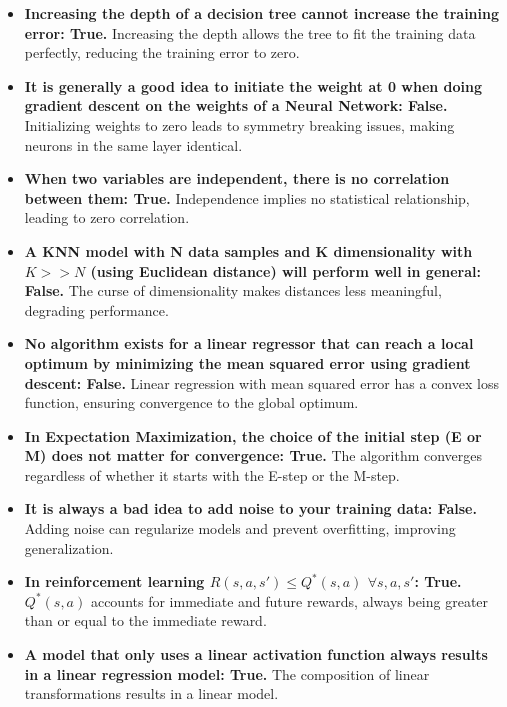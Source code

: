 \documentclass[10pt,a4paper]{article}
\begin{document}
\begin{itemize}
    \item \textbf{Increasing the depth of a decision tree cannot increase the training error: True.} Increasing the depth allows the tree to fit the training data perfectly, reducing the training error to zero.

    \item \textbf{It is generally a good idea to initiate the weight at 0 when doing gradient descent on the weights of a Neural Network: False.} Initializing weights to zero leads to symmetry breaking issues, making neurons in the same layer identical.

    \item \textbf{When two variables are independent, there is no correlation between them: True.} Independence implies no statistical relationship, leading to zero correlation.

    \item \textbf{A KNN model with N data samples and K dimensionality with $K >> N$ (using Euclidean distance) will perform well in general: False.} The curse of dimensionality makes distances less meaningful, degrading performance.

    \item \textbf{No algorithm exists for a linear regressor that can reach a local optimum by minimizing the mean squared error using gradient descent: False.} Linear regression with mean squared error has a convex loss function, ensuring convergence to the global optimum.

    \item \textbf{In Expectation Maximization, the choice of the initial step (E or M) does not matter for convergence: True.} The algorithm converges regardless of whether it starts with the E-step or the M-step.

    \item \textbf{It is always a bad idea to add noise to your training data: False.} Adding noise can regularize models and prevent overfitting, improving generalization.

    \item \textbf{In reinforcement learning $R(s, a, s') \leq Q^*(s, a)$ $\forall s, a, s'$: True.} $Q^*(s, a)$ accounts for immediate and future rewards, always being greater than or equal to the immediate reward.

    \item \textbf{A model that only uses a linear activation function always results in a linear regression model: True.} The composition of linear transformations results in a linear model.


\end{itemize}
\end{document}
